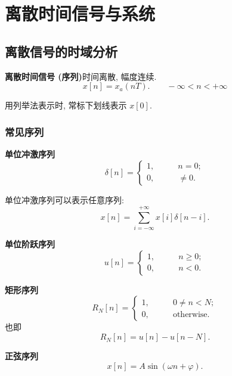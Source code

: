 \section{离散时间信号与系统}
\subsection{离散信号的时域分析}
\textbf{离散时间信号 (序列)}\quad 时间离散, 幅度连续.
\begin{equation}
    x[n]=x_a(nT). \qquad -\infty<n<+\infty
\end{equation}

用列举法表示时, 常标下划线表示 $x[0]$.

\subsubsection{常见序列}
\textbf{单位冲激序列}
\begin{equation}
    \delta[n]=\begin{cases}
        1, & \qquad n=0;    \\
        0, & \qquad \neq 0.
    \end{cases}
\end{equation}

单位冲激序列可以表示任意序列:
\begin{equation}
    x[n]=\sum_{i=-\infty}^{+\infty}x[i]\delta[n-i].
\end{equation}

\textbf{单位阶跃序列}
\begin{equation}
    u[n]=\begin{cases}
        1, & \qquad n\geq 0; \\
        0, & \qquad n<0.
    \end{cases}
\end{equation}

\textbf{矩形序列}
\begin{equation}
    R_N[n]=\begin{cases}
        1, & \qquad 0\neq n<N;        \\
        0, & \qquad \text{otherwise}.
    \end{cases}
\end{equation}
也即
\begin{equation}
    R_N[n]=u[n]-u[n-N].
\end{equation}

\textbf{正弦序列}
\begin{equation}
    x[n]=A\sin(\omega n+\varphi).
\end{equation}

